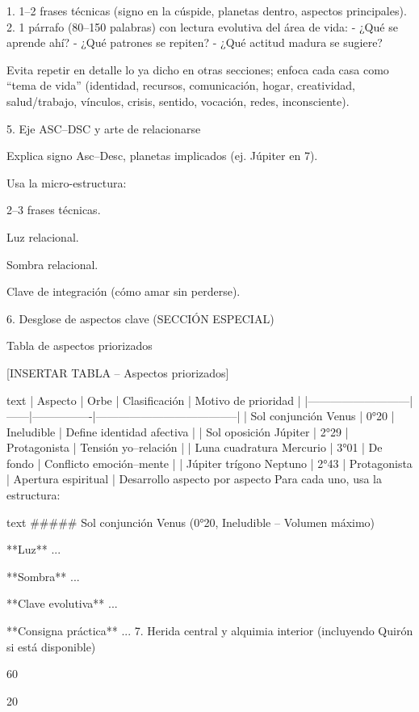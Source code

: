 1. 1–2 frases técnicas (signo en la cúspide, planetas dentro, aspectos principales).  
2. 1 párrafo (80–150 palabras) con lectura evolutiva del área de vida:  
   - ¿Qué se aprende ahí?  
   - ¿Qué patrones se repiten?  
   - ¿Qué actitud madura se sugiere?

Evita repetir en detalle lo ya dicho en otras secciones; enfoca cada casa como “tema de vida” (identidad, recursos, comunicación, hogar, creatividad, salud/trabajo, vínculos, crisis, sentido, vocación, redes, inconsciente).


5. Eje ASC–DSC y arte de relacionarse

Explica signo Asc–Desc, planetas implicados (ej. Júpiter en 7).

Usa la micro-estructura:

2–3 frases técnicas.

Luz relacional.

Sombra relacional.

Clave de integración (cómo amar sin perderse).

6. Desglose de aspectos clave (SECCIÓN ESPECIAL)

Tabla de aspectos priorizados

[INSERTAR TABLA – Aspectos priorizados]

text
| Aspecto                    | Orbe | Clasificación  | Motivo de prioridad                  |
|---------------------------|------|----------------|--------------------------------------|
| Sol conjunción Venus      | 0°20 | Ineludible     | Define identidad afectiva            |
| Sol oposición Júpiter     | 2°29 | Protagonista   | Tensión yo–relación                  |
| Luna cuadratura Mercurio  | 3°01 | De fondo       | Conflicto emoción–mente              |
| Júpiter trígono Neptuno   | 2°43 | Protagonista   | Apertura espiritual                  |
Desarrollo aspecto por aspecto
Para cada uno, usa la estructura:

text
##### Sol conjunción Venus (0°20, Ineludible – Volumen máximo)

**Luz**  
...

**Sombra**  
...

**Clave evolutiva**  
...

**Consigna práctica**  
...
7. Herida central y alquimia interior (incluyendo Quirón si está disponible)

60%

20%

